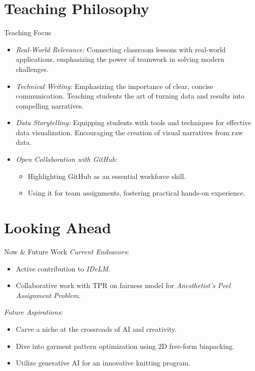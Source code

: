 \documentclass[
    NAME={Dr. Helga Ingimundardóttir},
    EMAIL={helgaingim@hi.is},
    FACULTY={Industrial Engineering},
    SUBTITLE={From Smart Algorithms in Fish Portioning to Pioneering Pipelines in Long-Range DNA Sequencing and Digital Travel},
    SEMINAR={IVT Faculty Gathering},
    DATE={September 6, 2023}
]{hi-latex/hi-beamer}
\begin{document}
\section{Teaching Philosophy}
\begin{frame}{Teaching Focus}
    \begin{itemize}
        \item \emph{Real-World Relevance:} Connecting classroom lessons with real-world applications,
        emphasizing the power of teamwork in solving modern challenges.

        \item \emph{Technical Writing:} Emphasizing the importance of clear, concise communication.
        Teaching students the art of turning data and results into compelling narratives.

        \item \emph{Data Storytelling:} Equipping students with tools and techniques for effective data visualization.
        Encouraging the creation of visual narratives from raw data.

        \item \emph{Open Collaboration with GitHub:}
            \begin{itemize}
                \item Highlighting GitHub as an essential workforce skill.
                \item Using it for team assignments, fostering practical hands-on experience.
            \end{itemize}

    \end{itemize}
\end{frame}


\section{Looking Ahead}
\begin{frame}{Now \& Future Work}
\emph{Current Endeavors}:
    \begin{itemize}
        \item Active contribution to \emph{IDeLM}.
        \item Collaborative work with TPR on fairness model for \emph{Anesthetist's Peel Assignment Problem}.
    \end{itemize}
    \bigskip
\emph{Future Aspirations}:
        \begin{itemize}
            \item Carve a niche at the crossroads of AI and creativity.
            \item Dive into garment pattern optimization using 2D free-form binpacking.
            \item Utilize generative AI for an innovative knitting program.
        \end{itemize}
\end{frame}
\end{document}
